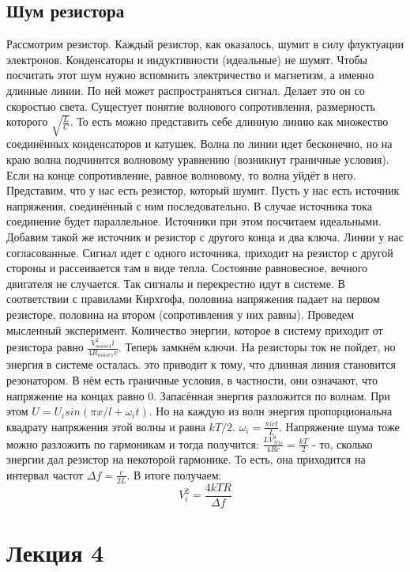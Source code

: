 \documentclass[a4paper, 12pt]{article}
\begin{document}
	\subsection{Шум резистора}
	Рассмотрим резистор. Каждый резистор, как оказалось, шумит в силу флуктуации электронов. Конденсаторы и индуктивности (идеальные) не шумят. Чтобы посчитать этот шум нужно вспомнить электричество и магнетизм, а именно длинные линии. По ней может распространяться сигнал. Делает это он со скоростью света. Сущестует понятие волнового сопротивления, размерность которого $\sqrt{\frac{L}{C}}$. То есть можно представить себе длинную линию как множество соединённых конденсаторов и катушек. Волна по линии идет бесконечно, но на краю волна подчинится волновому уравнению (возникнут граничные условия). Если на конце сопротивление, равное волновому, то волна уйдёт в него. Представим, что у нас есть резистор, который шумит. Пусть у нас есть источник напряжения, соединённый с ним последовательно. В случае источника тока соединение будет параллельное. Источники при этом посчитаем идеальными. Добавим такой же источник и резистор с другого конца и два ключа. Линии у нас согласованные. Сигнал идет с одного источника, приходит на резистор с другой стороны и рассеивается там в виде тепла. Состояние равновесное, вечного двигателя не случается. Так сигналы и перекрестно идут в системе. В соответствии с правилами Кирхгофа, половина напряжения падает на первом резисторе, половина на втором (сопротивления у них равны). Проведем мысленный эксперимент. Количество энергии, которое в систему приходит от резистора равно $\frac{V_{noise1}^2 l} {4R_{noise1} c }$. Теперь замкнём ключи. На резисторы ток не пойдет, но энергия в системе осталась. это приводит к тому, что длинная линия становится резонатором. В нём есть граничные условия, в частности, они означают, что напряжение на концах равно 0. Запасённая энергия разложится по волнам. При этом $U = U_{i} sin(\pi x/ l  + \omega_{i} t) $.  Но на каждую из волн энергия пропорциональна квадрату напряжения этой волны и равна $kT/2$. $\omega_i = \frac{\pi i c t}{L}$.  Напряжение шума тоже можно разложить по гармоникам и тогда получится: $\frac{LV_{N1i}^{2}}{4Rc}=\frac{kT}{2}$ - то, сколько энергии дал резистор на некоторой гармонике. То есть, она приходится на интервал частот $\Delta f= \frac{c}{2L}$. В итоге получаем:
	\begin{equation*}
		V_{i}^{2}=\frac{4kTR}{\Delta f}
	\end{equation*}
	\section{Лекция 4}
\end{document}
